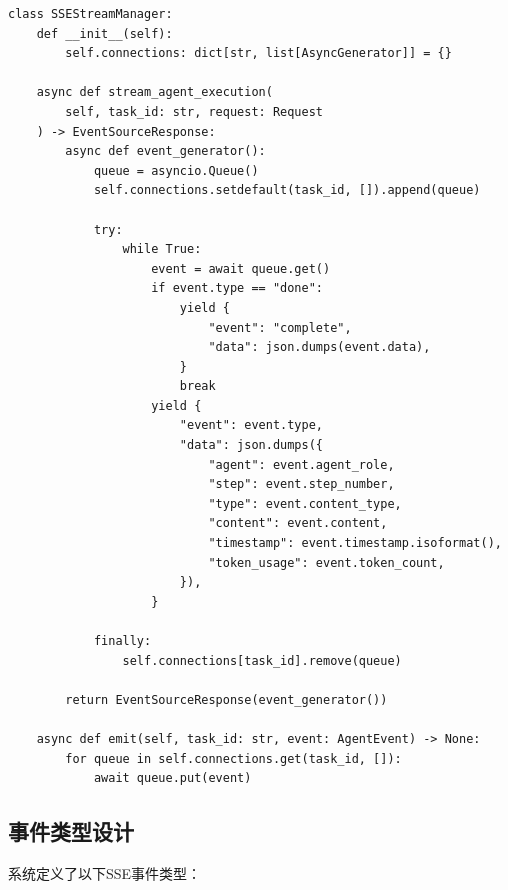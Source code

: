 \documentclass[12pt,a4paper]{ctexrep}
\begin{document}
\begin{lstlisting}[language=Python3,caption=SSE流式传输实现,label=lst:sse]
class SSEStreamManager:
    def __init__(self):
        self.connections: dict[str, list[AsyncGenerator]] = {}

    async def stream_agent_execution(
        self, task_id: str, request: Request
    ) -> EventSourceResponse:
        async def event_generator():
            queue = asyncio.Queue()
            self.connections.setdefault(task_id, []).append(queue)

            try:
                while True:
                    event = await queue.get()
                    if event.type == "done":
                        yield {
                            "event": "complete",
                            "data": json.dumps(event.data),
                        }
                        break
                    yield {
                        "event": event.type,
                        "data": json.dumps({
                            "agent": event.agent_role,
                            "step": event.step_number,
                            "type": event.content_type,
                            "content": event.content,
                            "timestamp": event.timestamp.isoformat(),
                            "token_usage": event.token_count,
                        }),
                    }

            finally:
                self.connections[task_id].remove(queue)

        return EventSourceResponse(event_generator())

    async def emit(self, task_id: str, event: AgentEvent) -> None:
        for queue in self.connections.get(task_id, []):
            await queue.put(event)
\end{lstlisting}

\subsection{事件类型设计}

系统定义了以下SSE事件类型：
\end{document}
